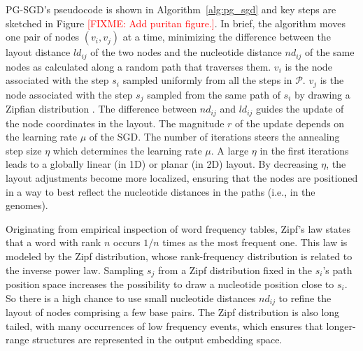 \documentclass{bioinfo}
\theoremstyle{definition}
\newcommand{\red}[1]{{\textcolor{Red}{#1}}}
\newcommand{\FIXME}[1]{\red{[FIXME: #1]}}
\begin{document}
	PG-SGD's pseudocode is shown in Algorithm~\ref{alg:pg_sgd} and key steps are sketched in Figure \FIXME{Add puritan figure.}.
	In brief, the algorithm moves one pair of nodes $( v_i, v_j )$ at a time, minimizing the difference between the layout distance $ld_{ij}$ of the two nodes and the nucleotide distance $nd_{ij}$ of the same nodes as calculated along a random path that traverses them.
	$v_i$ is the node associated with the step $s_i$ sampled uniformly from all the steps in $\mathcal{P}$.
	$v_j$ is the node associated with the step $s_j$ sampled from the same path of $s_i$ by drawing a Zipfian distribution \citep{Zipf1932}.
	The difference between $nd_{ij}$ and $ld_{ij}$ guides the update of the node coordinates in the layout.
	The magnitude $r$ of the update depends on the learning rate $\mu$ of the SGD.
	The number of iterations steers the annealing step size $\eta$ which determines the learning rate $\mu$.
	A large $\eta$ in the first iterations leads to a globally linear (in 1D) or planar (in 2D) layout.
	By decreasing $\eta$, the layout adjustments become more localized, ensuring that the nodes are positioned in a way to best reflect the nucleotide distances in the paths (i.e., in the genomes). %
	
	


	Originating from empirical inspection of word frequency tables, Zipf's law states that a word with rank $n$ occurs $1/n$ times as the most frequent one.
    This law is modeled by the Zipf distribution, whose rank-frequency distribution is related to the inverse power law. %
	Sampling $s_j$ from a Zipf distribution fixed in the $s_i$'s path position space increases the possibility to draw a nucleotide position close to $s_i$.
	So there is a high chance to use small nucleotide distances $nd_{ij}$ to refine the layout of nodes comprising a few base pairs.
    The Zipf distribution is also long tailed, with many occurrences of low frequency events, which ensures that longer-range structures are represented in the output embedding space.
\end{document}
